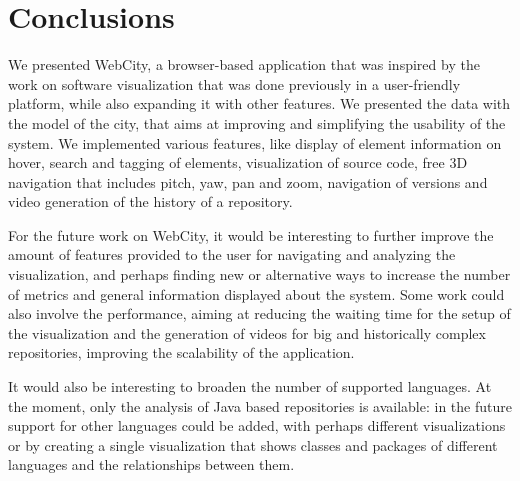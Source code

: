 \documentclass[]{usiinfbachelorproject}
\begin{document}
\section{Conclusions} \label{Conclusions and future work}
We presented WebCity, a browser-based application that was inspired by the work on software visualization that was done previously \cite{Wett07b} \cite{Wett2008b} \cite{Wett2008a} in a user-friendly platform, while also expanding it with other features.
We presented the data with the model of the city, that aims at improving and simplifying the usability of the system.
We implemented various features, like display of element information on hover, search and tagging of elements, visualization of source code, free 3D navigation that includes pitch, yaw, pan and zoom, navigation of versions and video generation of the history of a repository.

For the future work on WebCity, it would be interesting to further improve the amount of features provided to the user for navigating and analyzing the visualization, and perhaps finding new or alternative ways to increase the number of metrics and general information displayed about the system.
Some work could also involve the performance, aiming at reducing the waiting time for the setup of the visualization and the generation of videos for big and historically complex repositories, improving the scalability of the application.

It would also be interesting to broaden the number of supported languages. At the moment, only the analysis of Java based repositories is available: in the future support for other languages could be added, with perhaps different visualizations or by creating a single visualization that shows classes and packages of different languages and the relationships between them.
\end{document}
